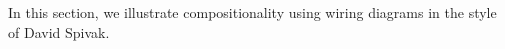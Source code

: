 
In this section, we illustrate compositionality using wiring diagrams in the style of David Spivak.


